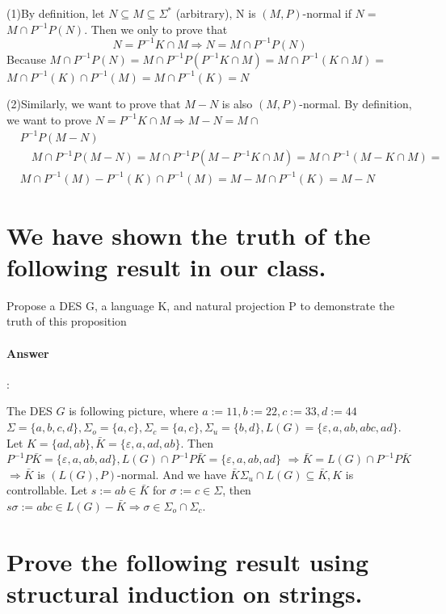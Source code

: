 \documentclass{article}
\begin{document}
(1)By definition, let $N \subseteq M \subseteq \Sigma^*$ (arbitrary), $\mathrm{N}$ is $(M, P)$-normal if $N=$ $M \cap P^{-1} P(N)$. Then we only to prove that
$$
N=P^{-1} K \cap M \Longrightarrow N=M \cap P^{-1} P(N)
$$
Because $M \cap P^{-1} P(N)=M \cap P^{-1} P\left(P^{-1} K \cap M\right)=M \cap P^{-1}(K \cap M)=$ $M \cap P^{-1}(K) \cap P^{-1}(M)=M \cap P^{-1}(K)=N$

(2)Similarly, we want to prove that $M-N$ is also $(M, P)$-normal.
By definition, we want to prove $N=P^{-1} K \cap M \Longrightarrow M-N=M \cap$
$$
\begin{aligned}
& P^{-1} P(M-N) \\
& \quad M \cap P^{-1} P(M-N)=M \cap P^{-1} P\left(M-P^{-1} K \cap M\right)=M \cap P^{-1}(M-K \cap M)= \\
& M \cap P^{-1}(M)-P^{-1}(K) \cap P^{-1}(M)=M-M \cap P^{-1}(K)=M-N
\end{aligned}
$$


\section{We have shown the truth of the following result in our class.}

Propose a DES G, a language K, and natural projection P to demonstrate the truth of this proposition

\paragraph{Answer}:


The DES $G$ is following picture, where $a:=11, b:=22, c:=33, d:=44$ $\Sigma=\{a, b, c, d\}, \Sigma_o=\{a, c\}, \Sigma_c=\{a, c\}, \Sigma_u=\{b, d\}, L(G)=\{\varepsilon, a, a b, a b c, a d\}$. Let $K=\{a d, a b\}, \bar{K}=\{\varepsilon, a, a d, a b\}$.
Then $P^{-1} P \bar{K}=\{\varepsilon, a, a b, a d\}, L(G) \cap P^{-1} P \bar{K}=\{\varepsilon, a, a b, a d\}$ $\Longrightarrow \bar{K}=L(G) \cap P^{-1} P \bar{K}$
$\Longrightarrow \bar{K}$ is $(L(G), P)$-normal.
And we have $\bar{K} \Sigma_u \cap L(G) \subseteq \bar{K}, K$ is controllable. Let $s:=a b \in \bar{K}$ for $\sigma:=c \in \Sigma$, then $s \sigma:=a b c \in L(G)-\bar{K} \Longrightarrow \sigma \in \Sigma_o \cap \Sigma_c$.

\section{Prove the following result using structural induction on strings.}
\end{document}
